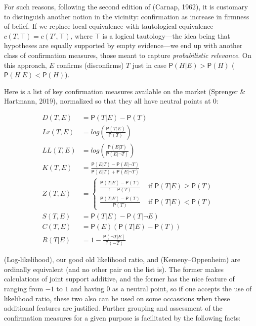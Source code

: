 \documentclass[
  10pt,
  dvipsnames,enabledeprecatedfontcommands]{scrartcl}
\newcommand{\n}{\neg}
\newcommand{\pr}[1]{\mathsf{P}(#1)}
\begin{document}
For such reasons, following the second edition of (Carnap, 1962), it is
customary to distinguish another notion in the vicinity: confirmation as
increase in firmness of belief. If we replace local equivalence with
tautological equivalence \(c(T, \top) = c(T', \top)\), where \(\top\) is
a logical tautology---the idea being that hypotheses are equally
supported by empty evidence---we end up with another class of
confirmation measures, those meant to capture
\emph{probabilistic relevance}. On this approach, \(E\) confirms
(disconfirms) \(T\) just in case \(\pr{H \vert E} > \pr{H}\)
(\(\pr{H \vert E} < \pr{H}\)).

Here is a list of key confirmation measures available on the market
(Sprenger \& Hartmann, 2019), normalized so that they all have neutral
points at 0:

\begin{align}
\tag{Difference}  D(T,E) & = \pr{T\vert E} - \pr{T}\\
\tag{Log-ratio}  Lr(T,E) &  = log\left(\frac{\pr{T\vert E}}{\pr{T}} \right) \\
\tag{Log-likelihood}   LL(T,E) & = log\left(\frac{\pr{E \vert T}}{\pr{E \vert \n T}} \right)\\
\tag{Kemeny-Oppenheim}  K(T,E) & = \frac{\pr{E\vert T} - \pr{E \vert \n T}}{\pr{E \vert T} + \pr{E \vert \n T}} \\
\tag{Generalized entailment}  Z(T,E) & = \begin{cases}
\frac{\pr{T\vert E} - \pr{T}}{1-\pr{T}} & \mbox{ if } \pr{T \vert E} \geq \pr{T}\\
\frac{\pr{T\vert E} - \pr{T}}{\pr{T}} & \mbox{ if } \pr{T \vert E} < \pr{T}
\end{cases} \\
\tag{Christensen-Joyce} S(T,E) & = \pr{T \vert E} - \pr{T \vert \n E} \\
\tag{Carnap}  C(T,E) & = \pr{E}(\pr{T\vert E} - \pr{T})\\
\tag{Rips} R(T\vert E) & = 1 - \frac{\pr{\n T\vert E}}{\pr{-T}}
\end{align}

(Log-likelihood), our good old likelihood ratio, and (Kemeny--Oppenheim)
are ordinally equivalent (and no other pair on the list is). The former
makes calculations of joint support additive, and the former has the
nice feature of ranging from \(-1\) to \(1\) and having 0 as a neutral
point, so if one accepts the use of likelihood ratio, these two also can
be used on some occassions when these additional features are justified.
Further grouping and assessment of the confirmation measures for a given
purpose is facilitated by the following facts:
\end{document}
